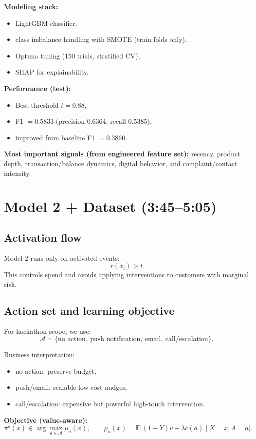 \documentclass[11pt,a4paper]{article}
\begin{document}
\textbf{Modeling stack:}
\begin{itemize}
    \item LightGBM classifier,
    \item class imbalance handling with SMOTE (train folds only),
    \item Optuna tuning (150 trials, stratified CV),
    \item SHAP for explainability.
\end{itemize}

\textbf{Performance (test):}
\begin{itemize}
    \item Best threshold $t=0.88$,
    \item F1 $=0.5833$ (precision 0.6364, recall 0.5385),
    \item improved from baseline F1 $=0.3860$.
\end{itemize}

\textbf{Most important signals (from engineered feature set):}
recency, product depth, transaction/balance dynamics, digital behavior, and complaint/contact intensity.

\section{Model 2 + Dataset (3:45--5:05)}
\subsection*{Activation flow}
Model 2 runs only on activated events:
\[
r(x_i) > t
\]
This controls spend and avoids applying interventions to customers with marginal risk.

\subsection*{Action set and learning objective}
For hackathon scope, we use:
\[
\mathcal{A}=\{\text{no action},\ \text{push notification},\ \text{email},\ \text{call/escalation}\}.
\]

Business interpretation:
\begin{itemize}
    \item no action: preserve budget,
    \item push/email: scalable low-cost nudges,
    \item call/escalation: expensive but powerful high-touch intervention.
\end{itemize}

\textbf{Objective (value-aware):}
\[
\pi^\star(x)\in\arg\max_{a\in\mathcal A}\mu_a(x),
\qquad
\mu_a(x)=\mathbb{E}\big[(1-Y)v-\lambda c(a)\mid X=x,A=a\big].
\]
\end{document}
